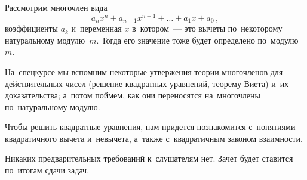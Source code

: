 



Рассмотрим многочлен вида
\[
    a_{n} x^{n} + a_{n-1} x^{n-1} + \ldots + a_{1} x + a_{0}
\, , \]
коэффициенты $a_{k}$ и~переменная $x$ в~котором~--- это вычеты по~некоторому
натуральному модулю~$m$.
Тогда его значение тоже будет определено по~модулю~$m$.

На~спецкурсе мы вспомним некоторые утвержения теории многочленов для
действительных чисел (решение квадратных уравнений, теорему Виета) и~их
доказательства;
а~потом поймем, как они переносятся на~многочлены по~натуральному модулю.

Чтобы решить квадратные уравнения, нам придется познакомится с~понятиями
квадратичного вычета и~невычета, а~также с~квадратичным законом взаимности.

Никаких предварительных требований к~слушателям нет.
Зачет будет ставится по~итогам сдачи задач.

